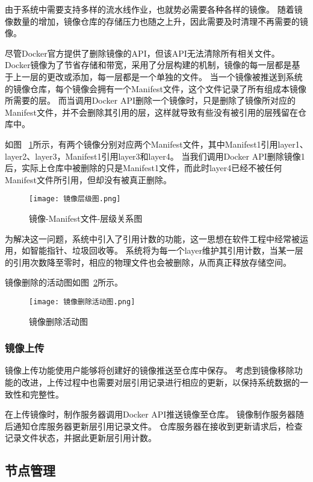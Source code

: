 由于系统中需要支持多样的流水线作业，也就势必需要各种各样的镜像。
随着镜像数量的增加，镜像仓库的存储压力也随之上升，因此需要及时清理不再需要的镜像。

尽管Docker官方提供了删除镜像的API，但该API无法清除所有相关文件。
Docker镜像为了节省存储和带宽，采用了分层构建的机制，镜像的每一层都是基于上一层的更改或添加，每一层都是一个单独的文件。
当一个镜像被推送到系统的镜像仓库，每个镜像会拥有一个Manifest文件，这个文件记录了所有组成本镜像所需要的层。
而当调用Docker API删除一个镜像时，只是删除了镜像所对应的Manifest文件，并不会删除其引用的层，这样就导致有些没有被引用的层残留在仓库中。

如图~ \ref{fig:镜像-Manifest文件-层级关系图}所示，有两个镜像分别对应两个Manifest文件，其中Manifest1引用layer1、layer2、layer3，Manifest1引用layer3和layer4。
当我们调用Docker API删除镜像1后，实际上仓库中被删除的只是Manifest1文件，而此时layer4已经不被任何Manifest文件所引用，但却没有被真正删除。

\begin{figure}[h]
  \centering
  \texttt{[image: 镜像层级图.png]}
  \caption{镜像-Manifest文件-层级关系图}
  \label{fig:镜像-Manifest文件-层级关系图}
\end{figure}

为解决这一问题，系统中引入了引用计数的功能，这一思想在软件工程中经常被运用，如智能指针、垃圾回收等。
系统将为每一个layer维护其引用计数，当某一层的引用次数降至零时，相应的物理文件也会被删除，从而真正释放存储空间。

镜像删除的活动图如图~\ref{fig:镜像删除活动图}所示。

\begin{figure}[h]
  \centering
  \texttt{[image: 镜像删除活动图.png]}
  \caption{镜像删除活动图}
  \label{fig:镜像删除活动图}
\end{figure}

\subsubsection{镜像上传}
镜像上传功能使用户能够将创建好的镜像推送至仓库中保存。
考虑到镜像移除功能的改进，上传过程中也需要对层引用记录进行相应的更新，以保持系统数据的一致性和完整性。

在上传镜像时，制作服务器调用Docker API推送镜像至仓库。
镜像制作服务器随后通知仓库服务器更新层引用记录文件。
仓库服务器在接收到更新请求后，检查记录文件状态，并据此更新层引用计数。

\subsection{节点管理}


